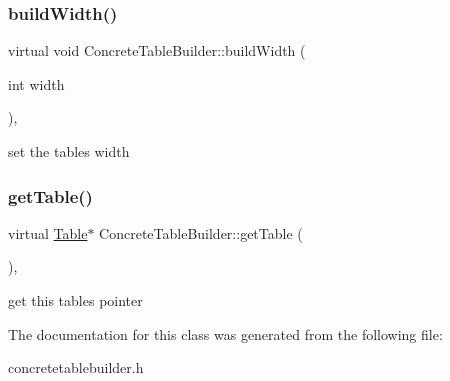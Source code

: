 \subsubsection{\texorpdfstring{build\+Width()}{buildWidth()}}
{\footnotesize\ttfamily virtual void Concrete\+Table\+Builder\+::build\+Width (\begin{DoxyParamCaption}\item[{int}]{width }\end{DoxyParamCaption})\hspace{0.3cm}{\ttfamily [inline]}, {\ttfamily [virtual]}}

set the table\textquotesingle{}s width \mbox{\label{class_concrete_table_builder_a0c1d21df18d11686736b84929deb669e}} 
\subsubsection{\texorpdfstring{get\+Table()}{getTable()}}
{\footnotesize\ttfamily virtual \mbox{\hyperlink{class_table}{Table}}$\ast$ Concrete\+Table\+Builder\+::get\+Table (\begin{DoxyParamCaption}{ }\end{DoxyParamCaption})\hspace{0.3cm}{\ttfamily [inline]}, {\ttfamily [virtual]}}

get this table\textquotesingle{}s pointer 

The documentation for this class was generated from the following file\+:\begin{DoxyCompactItemize}
\item 
concretetablebuilder.\+h\end{DoxyCompactItemize}
